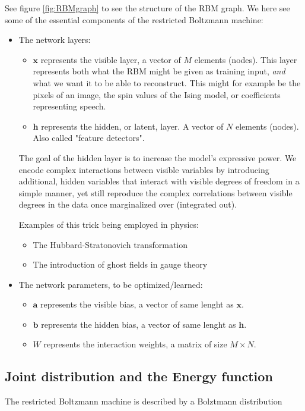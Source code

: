 \documentclass[norsk,a4paper,11pt]{article}
\newcommand{\Vx}{\mathbf{x}}
\newcommand{\Vh}{\mathbf{h}}
\newcommand{\Va}{\mathbf{a}}
\newcommand{\Vb}{\mathbf{b}}
\begin{document}
See figure \ref{fig:RBMgraph} to see the structure of the RBM graph. We here see some of the essential components of the restricted Boltzmann machine:
\begin{itemize}
\item The network layers:
\begin{itemize}
	\item $\Vx$ represents the visible layer, a vector of $M$ elements (nodes). This layer represents both what the RBM might be given as training input, \textit{and} what we want it to be able to reconstruct. This might for example be the pixels of an image, the spin values of the Ising model, or coefficients representing speech.
	\item $\Vh$ represents the hidden, or latent, layer. A vector of $N$ elements (nodes). Also called "feature detectors".
\end{itemize}
The goal of the hidden layer is to increase the model's expressive power. We encode complex interactions between visible variables by introducing additional, hidden variables that interact with visible degrees of freedom in a simple manner, yet still reproduce the complex correlations between visible degrees in the data once marginalized over (integrated out).

Examples of this trick being employed in physics: 
\begin{itemize}
	\item The Hubbard-Stratonovich transformation
	\item The introduction of ghost fields in gauge theory
\end{itemize}

\item The network parameters, to be optimized/learned:
\begin{itemize}
		\item $\Va$ represents the visible bias, a vector of same lenght as $\Vx$.
		\item $\Vb$ represents the hidden bias, a vector of same lenght as $\Vh$.
		\item $W$ represents the interaction weights, a matrix of size $M\times N$.
\end{itemize}
\end{itemize}


\subsection{Joint distribution and the Energy function}
The restricted Boltzmann machine is described by a Bolztmann distribution
\end{document}

